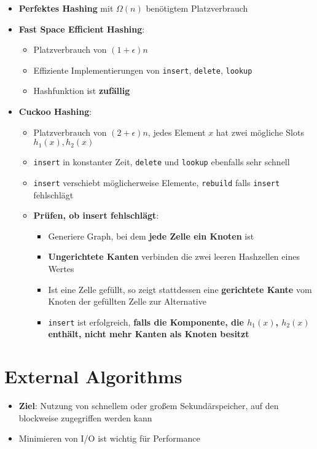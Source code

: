 \documentclass[10pt,a4paper]{article}
\begin{document}
	\begin{itemize}
		\item \textbf{Perfektes Hashing} mit $\Omega(n)$ benötigtem Platzverbrauch
		\item \textbf{Fast Space Efficient Hashing}:
		\begin{itemize}
			\item Platzverbrauch von $(1 + \epsilon)n$
			\item Effiziente Implementierungen von \texttt{insert}, \texttt{delete}, \texttt{lookup}
			\item Hashfunktion ist \textbf{zufällig}
		\end{itemize}
		\item \textbf{Cuckoo Hashing}:
		\begin{itemize}
			\item Platzverbrauch von $(2 + \epsilon)n$, jedes Element $x$ hat zwei mögliche Slots $h_1(x), h_2(x)$
			\item \texttt{insert} in konstanter Zeit, \texttt{delete} und \texttt{lookup} ebenfalls sehr schnell
			\item \texttt{insert} verschiebt möglicherweise Elemente, \texttt{rebuild} falls \texttt{insert} fehlschlägt
			\item \textbf{Prüfen, ob insert fehlschlägt}:
			\begin{itemize}
				\item Generiere Graph, bei dem \textbf{jede Zelle ein Knoten} ist
				\item \textbf{Ungerichtete Kanten} verbinden die zwei leeren Hashzellen eines Wertes
				\item Ist eine Zelle gefüllt, so zeigt stattdessen eine \textbf{gerichtete Kante} vom Knoten der gefüllten Zelle zur Alternative
				\item \texttt{insert} ist erfolgreich, \textbf{falls die Komponente, die $h_1(x)$, $h_2(x)$ enthält, nicht mehr Kanten als Knoten besitzt}
			\end{itemize}
		\end{itemize}
	\end{itemize}

	\newpage
	\section{External Algorithms}
	\label{ea:sec:external_algorithms}
	
	\begin{itemize}
		\item \textbf{Ziel}: Nutzung von schnellem oder großem Sekundärspeicher, auf den blockweise zugegriffen werden kann
		\item Minimieren von I/O ist wichtig für Performance
	\end{itemize}
\end{document}
